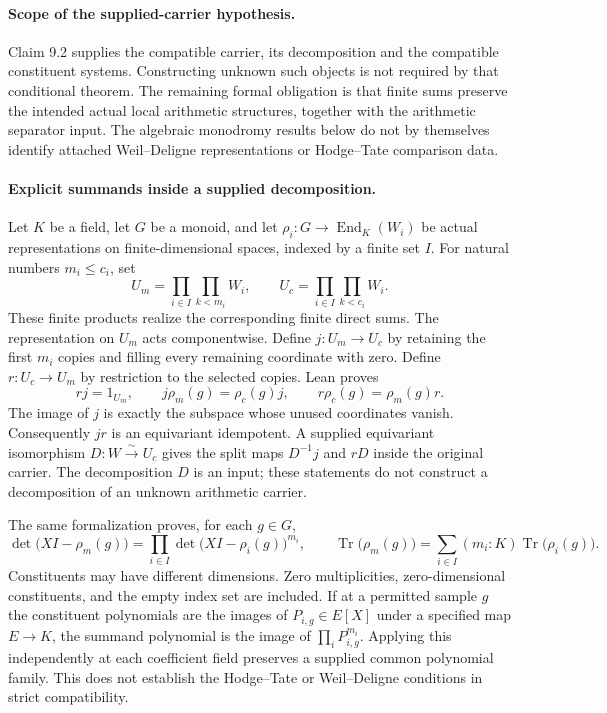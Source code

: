 \documentclass[11pt]{article}
\theoremstyle{definition}
\theoremstyle{remark}
\begin{document}
\paragraph{Scope of the supplied-carrier hypothesis.}
Claim 9.2 supplies the compatible carrier, its decomposition and the compatible
constituent systems. Constructing unknown such objects is not required by that
conditional theorem. The remaining formal obligation is that finite sums preserve
the intended actual local arithmetic structures, together with the arithmetic
separator input. The algebraic monodromy results below do not by themselves
identify attached Weil--Deligne representations or Hodge--Tate comparison data.

\paragraph{Explicit summands inside a supplied decomposition.}
Let $K$ be a field, let $G$ be a monoid, and let
$\rho_i:G\to\operatorname{End}_K(W_i)$ be actual representations on
finite-dimensional spaces, indexed by a finite set $I$. For natural numbers
$m_i\le c_i$, set
\[
 U_m=\prod_{i\in I}\prod_{k<m_i}W_i,
 \qquad U_c=\prod_{i\in I}\prod_{k<c_i}W_i.
\]
These finite products realize the corresponding finite direct sums. The
representation on $U_m$ acts componentwise. Define $j:U_m\to U_c$ by retaining
the first $m_i$ copies and filling every remaining coordinate with zero.
Define $r:U_c\to U_m$ by restriction to the selected copies. Lean proves
\[
 rj=1_{U_m},\qquad
 j\rho_m(g)=\rho_c(g)j,\qquad
 r\rho_c(g)=\rho_m(g)r.
\]
The image of $j$ is exactly the subspace whose unused coordinates vanish.
Consequently $jr$ is an equivariant idempotent. A supplied equivariant
isomorphism $D:W\xrightarrow{\sim}U_c$ gives the split maps
$D^{-1}j$ and $rD$ inside the original carrier. The decomposition $D$ is an
input; these statements do not construct a decomposition of an unknown
arithmetic carrier.

The same formalization proves, for each $g\in G$,
\[
 \det\bigl(XI-\rho_m(g)\bigr)
 =\prod_{i\in I}\det\bigl(XI-\rho_i(g)\bigr)^{m_i},
 \qquad
 \operatorname{Tr}\bigl(\rho_m(g)\bigr)
 =\sum_{i\in I}(m_i:K)\operatorname{Tr}\bigl(\rho_i(g)\bigr).
\]
Constituents may have different dimensions. Zero multiplicities, zero-dimensional
constituents, and the empty index set are included. If at a permitted sample
$g$ the constituent polynomials are the images of $P_{i,g}\in E[X]$ under a
specified map $E\to K$, the summand polynomial is the image of
$\prod_iP_{i,g}^{m_i}$. Applying this independently at each coefficient field
preserves a supplied common polynomial family. This does not establish the
Hodge--Tate or Weil--Deligne conditions in strict compatibility.
\end{document}
